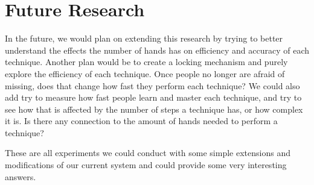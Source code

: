 \section{Future Research} \label{sec:futureresearch}
In the future, we would plan on extending this research by trying to better understand the effects the number of hands has on efficiency and accuracy of each technique.
Another plan would be to create a locking mechanism and purely explore the efficiency of each technique. 
Once people no longer are afraid of missing, does that change how fast they perform each technique?
We could also add try to measure how fast people learn and master each technique, and try to see how that is affected by the number of steps a technique has, or how complex it is. 
Is there any connection to the amount of hands needed to perform a technique?

These are all experiments we could conduct with some simple extensions and modifications of our current system and could provide some very interesting answers.